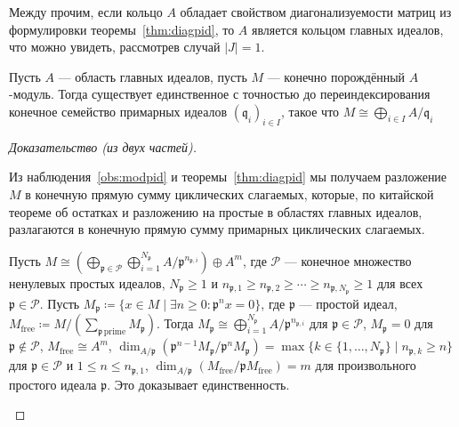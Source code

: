 \documentclass[
	extrafontsizes,
	11pt,
	hyphens,
]{memoir}
\begin{document}
\begin{remark}
Между прочим, если кольцо \(A\) обладает свойством диагонализуемости матриц из формулировки теоремы~\ref{thm:diagpid}, то \(A\) является кольцом главных идеалов, что можно увидеть, рассмотрев случай \(\lvert J \rvert = 1\).
\end{remark}

\begin{theorem}
Пусть \(A\) --- область главных идеалов, пусть \(M\) --- конечно порождённый \(A\)-модуль. Тогда существует единственное с точностью до переиндексирования конечное семейство примарных идеалов \((\mathfrak{q}_i)_{i \in I}\), такое что \(M \cong \bigoplus_{i \in I} A / \mathfrak{q}_i\)
\end{theorem}

\begin{proof}[Доказательство (из двух частей)]
~\begin{proofdescription}

\item[Доказательство существования.]
Из наблюдения~\ref{obs:modpid} и теоремы~\ref{thm:diagpid} мы получаем разложение \(M\) в конечную прямую сумму циклических слагаемых, которые, по китайской теореме об остатках и разложению на простые в областях главных идеалов, разлагаются в конечную прямую сумму примарных циклических слагаемых.

\item[Доказательство единственности.]
Пусть
\(
M \cong (\bigoplus_{\mathfrak{p} \in \mathcal{P}} \bigoplus_{i = 1}^{N_\mathfrak{p}} A/{\mathfrak{p}}^{n_{\mathfrak{p},i}}) \oplus A^m
\),
где \(\mathcal{P}\) --- конечное множество ненулевых простых идеалов,
\(N_\mathfrak{p} \geq 1\) и \(n_{\mathfrak{p},1} \geq n_{\mathfrak{p},2} \geq \cdots \geq n_{\mathfrak{p},N_\mathfrak{p}} \geq 1\) для всех \(\mathfrak{p} \in \mathcal{P}\).
Пусть \(M_\mathfrak{p} \coloneqq \{x \in M \mid \exists n \geq 0 : \mathfrak{p}^n x = 0\}\), где \(\mathfrak{p}\) --- простой идеал, \(M_\mathrm{free} \coloneqq M / (\sum_{\mathfrak{p}\, \text{prime}} M_\mathfrak{p})\).
Тогда \(M_\mathfrak{p} \cong \bigoplus_{i = 1}^{N_\mathfrak{p}} A/\mathfrak{p}^{n_{\mathfrak{p},i}}\) для \(\mathfrak{p} \in \mathcal{P}\), \(M_\mathfrak{p} = 0\) для \(\mathfrak{p} \notin \mathcal{P}\), \(M_\mathrm{free} \cong A^m\), \(\dim_{A/\mathfrak{p}}(\mathfrak{p}^{n-1}M_\mathfrak{p} / \mathfrak{p}^n M_\mathfrak{p}) = \max\{k \in \{1,\dots{},N_\mathfrak{p}\} \mid n_{\mathfrak{p},k} \geq n\}\) для \(\mathfrak{p} \in \mathcal{P}\) и \(1 \leq n \leq n_{\mathfrak{p},1}\), \(\dim_{A/\mathfrak{p}}(M_\mathrm{free}/\mathfrak{p}M_\mathrm{free}) = m\) для произвольного простого идеала \(\mathfrak{p}\). Это доказывает единственность.
\qedhere

\end{proofdescription}
\end{proof}
\end{document}
